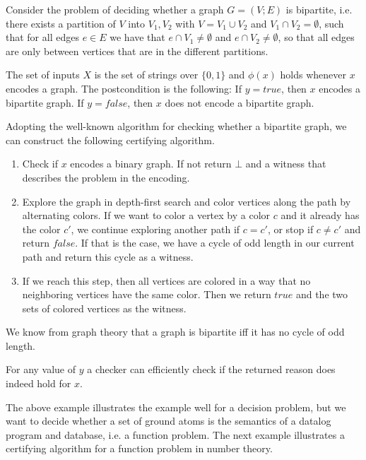 \begin{example}
    Consider the problem of deciding whether a graph $G=(V;E)$ is bipartite, i.e. there exists a partition of $V$ into $V_1, V_2$ with $V = V_1 \cup V_2$ and $V_1 \cap V_2 = \emptyset$, such that for all edges $e \in E$ we have that $e \cap V_1 \neq \emptyset$ and $e \cap V_2 \neq \emptyset$, so that all edges are only between vertices that are in the different partitions.

    The set of inputs $X$ is the set of strings over $\{0,1\}$ and $\phi(x)$ holds whenever $x$ encodes a graph. 
    The postcondition is the following: If $y= true$, then $x$ encodes a bipartite graph. If $y = false$, then $x$ does not encode a bipartite graph.

    Adopting the well-known algorithm for checking whether a bipartite graph, we can construct the following certifying algorithm.

    \begin{enumerate}
        \item Check if $x$ encodes a binary graph. If not return $\bot$ and a witness that describes the problem in the encoding.
        \item Explore the graph in depth-first search and color vertices along the path by alternating colors. If we want to color a vertex by a color $c$ and it already has the color $c'$, we continue exploring another path if $c=c'$, or stop if $c \neq c'$ and return $false$. If that is the case, we have a cycle of odd length in our current path and return this cycle as a witness.
        \item If we reach this step, then all vertices are colored in a way that no neighboring vertices have the same color. Then we return $true$ and the two sets of colored vertices as the witness. 
    \end{enumerate}

    We know from graph theory that a graph is bipartite iff it has no cycle of odd length.

    For any value of $y$ a checker can efficiently check if the returned reason does indeed hold for $x$.
\end{example}

The above example illustrates the example well for a decision problem, but we want to decide whether a set of ground atoms is the semantics of a datalog program and database, i.e. a function problem. The next example illustrates a certifying algorithm for a function problem in number theory.

